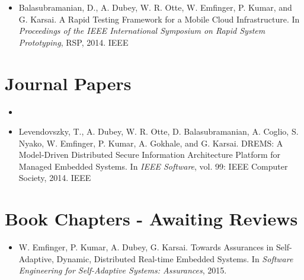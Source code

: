 \begin{appendices}
\begin{itemize}
	\item Balasubramanian, D., A. Dubey, W. R. Otte, W. Emfinger, P. Kumar, and G. Karsai. A Rapid Testing Framework for a Mobile Cloud Infrastructure.  In \textit{Proceedings of the IEEE International Symposium on Rapid System Prototyping}, RSP, 2014. IEEE
	
\end{itemize}

\section{Journal Papers}
\begin{itemize}
	\item {}
	
	\item Levendovszky, T., A. Dubey, W. R. Otte, D. Balasubramanian, A. Coglio, S. Nyako, W. Emfinger, P. Kumar, A. Gokhale, and G. Karsai. DREMS: A Model-Driven Distributed Secure Information Architecture Platform for Managed Embedded Systems. In \textit{IEEE Software}, vol. 99: IEEE Computer Society, 2014. IEEE	
\end{itemize}

\section{Book Chapters - Awaiting Reviews}
\begin{itemize}
	\item W. Emfinger, P. Kumar, A. Dubey, G. Karsai. Towards Assurances in Self-Adaptive, Dynamic, Distributed Real-time Embedded Systems. In \textit{Software Engineering for Self-Adaptive Systems: Assurances}, 2015.
\end{itemize}

\end{appendices}

